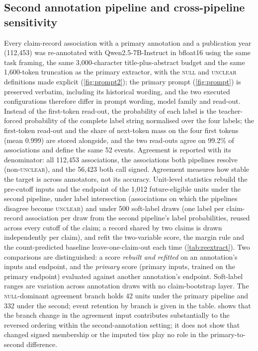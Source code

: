 \documentclass[11pt]{article}
\begin{document}
\subsection{Second annotation pipeline and cross-pipeline sensitivity}
\label{app:reextract}
Every claim-record association with a primary annotation and a publication year (112{,}453) was
re-annotated with Qwen2.5-7B-Instruct in bfloat16 using the same task framing, the same
3{,}000-character title-plus-abstract budget and the same 1{,}600-token truncation as the primary
extractor, with the \textsc{null} and \textsc{unclear} definitions made explicit
(\cref{fig:prompt2}); the primary prompt (\cref{fig:prompt}) is preserved verbatim, including its
historical wording, and the two executed configurations therefore differ in prompt wording, model
family and read-out. Instead of the first-token read-out, the probability of each label is the
teacher-forced probability of the complete label string normalised over the four labels; the
first-token read-out and the share of next-token mass on the four first tokens (mean 0.999) are
stored alongside, and the two read-outs agree on 99.2\% of associations and define the same 52
events. Agreement is reported with its denominator: all 112{,}453 associations, the associations
both pipelines resolve (non-\textsc{unclear}), and the 56{,}423 both call signed. Agreement measures how stable the target is across annotators, not its accuracy. Unit-level statistics rebuild the pre-cutoff inputs and the
endpoint of the 1{,}012 future-eligible units under the second pipeline, under label intersection
(associations on which the pipelines disagree become \textsc{unclear}) and under 500 soft-label
draws (one label per claim-record association per draw from the second pipeline's label
probabilities, reused across every cutoff of the claim; a record shared by two claims is drawn
independently per claim), and refit the two-variable score, the margin rule and the count-predicted
baseline leave-one-claim-out each time (\cref{tab:reextract}). Two comparisons are distinguished:
a score \emph{rebuilt and refitted} on an annotation's inputs and endpoint, and the \emph{primary}
score (primary inputs, trained on the primary endpoint) evaluated against another annotation's
endpoint. Soft-label ranges are variation across annotation draws with no claim-bootstrap layer.
The \textsc{null}-dominant agreement branch holds 42 units under the primary pipeline and 332
under the second; event retention by branch is given in the table.  shows
that the branch change in the agreement input contributes substantially to the reversed ordering
within the second-annotation setting; it does not show that changed signed membership or the
imputed ties play no role in the primary-to-second difference.
\end{document}

